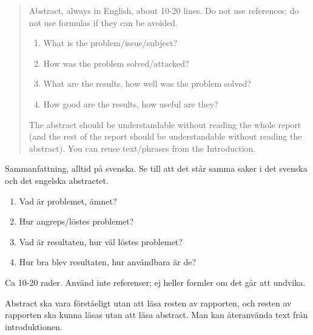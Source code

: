 \documentclass[a4paper,12pt]{article}
\begin{document}
\maketitle

\frontmatter

\begin{abstract}
Abstract, always in English, about 10-20 lines. Do not use references; do not use formulas if they can be avoided.
\begin{enumerate}
\item What is the problem/issue/subject?
\item How was the problem solved/attacked?
\item What are the results, how well was the problem solved?
\item How good are the results, how useful are they?
\end{enumerate}
The abstract should be understandable without reading the whole report (and the rest of the report should be understandable without reading the abstract). You can reuse text/phrases from the Introduction.
\end{abstract}

\begin{sammanfattning}
Sammanfattning, alltid på svenska. Se till att det står samma saker i det svenska och det engelska abstractet.
\begin{enumerate}
\item Vad är problemet, ämnet?
\item Hur angreps/löstes problemet?
\item Vad är resultaten, hur väl löstes problemet?
\item Hur bra blev resultaten, hur användbara är de?
\end{enumerate}

Ca 10-20 rader. Använd inte referenser; ej heller formler om det går att undvika.

Abstract ska vara förståeligt utan att läsa resten av rapporten, och resten av rapporten ska kunna läsas utan att läsa abstract. Man kan återanvända text från introduktionen.
\end{sammanfattning}

\tableofcontents


\cleardoublepage


\mainmatter
\end{document}
